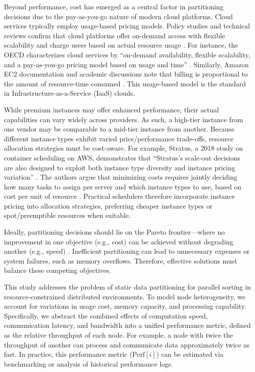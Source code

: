\documentclass{article}
\begin{document}
Beyond performance, cost has emerged as a central factor in partitioning decisions due to the pay-as-you-go nature of modern cloud platforms. Cloud services typically employ usage-based pricing models. Policy studies and technical reviews confirm that cloud platforms offer on-demand access with flexible scalability and charge users based on actual resource usage \cite{gptclaim3, gptclaim4}. For instance, the OECD characterizes cloud services by ``on-demand availability, flexible scalability, and a pay-as-you-go pricing model based on usage and time'' \cite{gptclaim3}. Similarly, Amazon EC2 documentation and academic discussions note that billing is proportional to the amount of resource-time consumed \cite{gptclaim4}. This usage-based model is the standard in Infrastructure-as-a-Service (IaaS) clouds.

While premium instances may offer enhanced performance, their actual capabilities can vary widely across providers. As such, a high-tier instance from one vendor may be comparable to a mid-tier instance from another. Because different instance types exhibit varied price/performance trade-offs, resource allocation strategies must be cost-aware. For example, Stratus, a 2018 study on container scheduling on AWS, demonstrates that ``Stratus’s scale-out decisions are also designed to exploit both instance type diversity and instance pricing variation'' \cite{gptclaim10}. The authors argue that minimizing costs requires jointly deciding how many tasks to assign per server and which instance types to use, based on cost per unit of resource \cite{gptclaim10}. Practical schedulers therefore incorporate instance pricing into allocation strategies, preferring cheaper instance types or spot/preemptible resources when suitable.

Ideally, partitioning decisions should lie on the Pareto frontier—where no improvement in one objective (e.g., cost) can be achieved without degrading another (e.g., speed) \cite{yoon_optimal_2014}. Inefficient partitioning can lead to unnecessary expenses or system failures, such as memory overflows. Therefore, effective solutions must balance these competing objectives.

This study addresses the problem of static data partitioning for parallel sorting in resource-constrained distributed environments. To model node heterogeneity, we account for variations in usage cost, memory capacity, and processing capability. Specifically, we abstract the combined effects of computation speed, communication latency, and bandwidth into a unified performance metric, defined as the relative throughput of each node. For example, a node with twice the throughput of another can process and communicate data approximately twice as fast. In practice, this performance metric ($\text{Perf}[i]$) can be estimated via benchmarking or analysis of historical performance logs.
\end{document}
